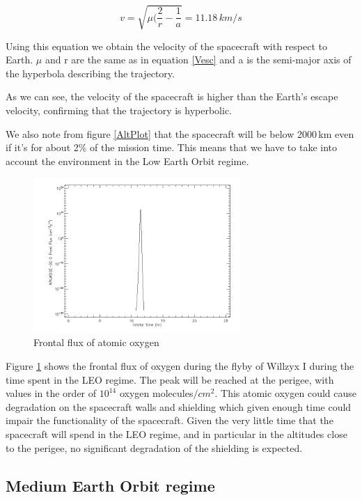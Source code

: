 \begin{equation}
v=\sqrt{\mu(\frac{2}{r}-\frac{1}{a}}=11.18\,km/s
\label{Vsc}
\end{equation}

Using this equation we obtain the velocity of the spacecraft with respect to Earth. $\mu$ and r are the same as in equation \ref{Vesc} and a is the semi-major axis of the hyperbola describing the trajectory.

As we can see, the velocity of the spacecraft is higher than the Earth's escape velocity, confirming that the trajectory is hyperbolic.

We also note from figure \ref{AltPlot} that the spacecraft will be below 2000\,km even if it's for about 2\% of the mission time. This means that we have to take into account the environment in the Low Earth Orbit regime.

\begin{figure}[H]
\centering
\includegraphics[width=0.7\textwidth]{figures/OxTime.png}
\caption{Frontal flux of atomic oxygen}
\label{Oxygen}
\end{figure}

Figure \ref{Oxygen} shows the frontal flux of oxygen during the flyby of Willzyx I during the time spent in the LEO regime. The peak will be reached at the perigee, with values in the order of $10^{14}$ oxygen molecules$/cm^2$. This atomic oxygen could cause degradation on the spacecraft walls and shielding which given enough time could impair the functionality of the spacecraft. Given the very little time that the spacecraft will spend in the LEO regime, and in particular in the altitudes close to the perigee, no significant degradation of the shielding is expected.

\subsection{Medium Earth Orbit regime}

